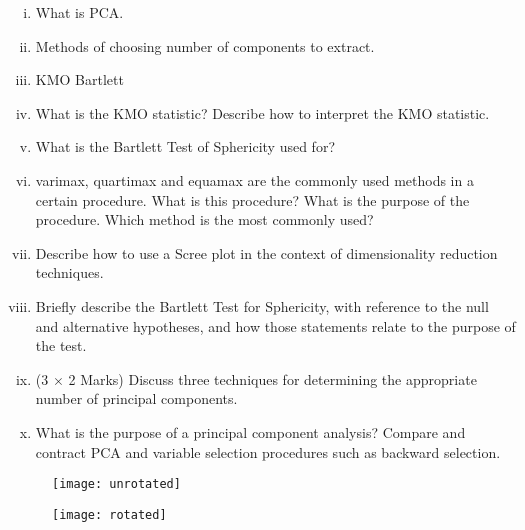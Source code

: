 \documentclass{article}
\begin{document}
\begin{enumerate}[(i)]
	\item 
	What is PCA. 
	\item Methods of choosing number of components to extract.
	
	\item KMO
	Bartlett

	
	\item What is the KMO statistic? Describe how to interpret the KMO statistic.
	\item What is the Bartlett Test of Sphericity used for?
	\item varimax, quartimax and equamax are the commonly used methods in a certain procedure. What is this procedure? What is the purpose of the procedure.
	Which method is the most commonly used?
	\item Describe how to use a Scree plot in the context of dimensionality reduction techniques.
	
	
	\item Briefly describe the Bartlett Test for Sphericity, with reference to the null and alternative
	hypotheses, and how those statements relate to the purpose of the test.
	\item (3 $\times$ 2 Marks) Discuss three techniques for determining the appropriate number of principal components.
	
	
	\item What is the purpose of a principal component analysis? Compare and contract PCA and variable selection procedures such as backward selection. 
	
\end{enumerate}\begin{figure}
\centering
\texttt{[image: unrotated]}
\caption{}
\label{fig:unrotated}
\end{figure}

\begin{figure}
\centering
\texttt{[image: rotated]}
\caption{}
\label{fig:rotated}
\end{figure}
\end{document}

